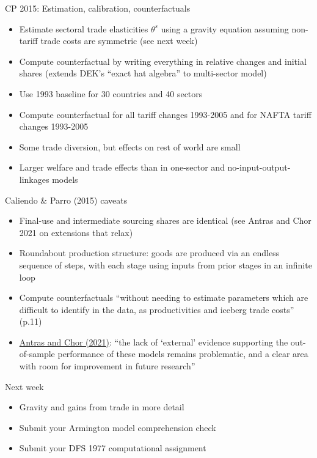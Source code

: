 \documentclass[10pt,notes=hide]{beamer}
\begin{document}
\begin{frame}{CP 2015: Estimation, calibration, counterfactuals}
\begin{itemize}
\item Estimate sectoral trade elasticities $\theta^s$
using a gravity equation assuming non-tariff trade costs are symmetric
(see next week)
\item Compute counterfactual by writing everything in relative changes and initial shares
(extends DEK's ``exact hat algebra'' to multi-sector model)
\item Use 1993 baseline for 30 countries and 40 sectors
\item Compute counterfactual for all tariff changes 1993-2005
and for NAFTA tariff changes 1993-2005
\item Some trade diversion, but effects on rest of world are small
\item Larger welfare and trade effects than in one-sector and no-input-output-linkages models
\end{itemize}
\end{frame}
\begin{frame}{Caliendo \& Parro (2015) caveats}
\begin{itemize}
\item Final-use and intermediate sourcing shares are identical (see Antras and Chor 2021 on extensions that relax)
\item Roundabout production structure:
goods are produced via an endless sequence of steps, with each stage using inputs from prior stages in an infinite loop
\item Compute counterfactuals ``without needing to estimate parameters which are difficult to identify in the data, as productivities and iceberg trade costs'' (p.11)
\item \href{https://scholar.harvard.edu/files/antras/files/antras_chor_gvc_chapter_long_version.pdf}{Antras and Chor (2021)}:
``the lack of `external' evidence supporting the out-of-sample performance of these models remains problematic, and a clear area with room for improvement in future research''
\end{itemize}
\end{frame}
\begin{frame}{Next week}
\begin{itemize}
	\item Gravity and gains from trade in more detail
	\item Submit your Armington model comprehension check
	\item Submit your DFS 1977 computational assignment
\end{itemize}
\end{frame}
\end{document}
